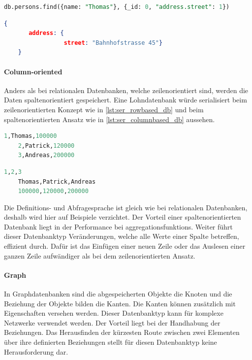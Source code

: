 \begin{lstlisting}[language=SQL, caption=Abfrage in MongoDB, label=lst:select_mongodb]  
    db.persons.find({name: "Thomas"}, {_id: 0, "address.street": 1})
\end{lstlisting}

\begin{lstlisting}[language=JSON, caption=Resultat der Abfrage in MongoDB, label=lst:select_result_mongodb]  
    {
       address: {
                 street: "Bahnhofstrasse 45"}
    }
\end{lstlisting}

\paragraph{Column-oriented}
Anders als bei relationalen Datenbanken, welche zeilenorientiert sind, werden die Daten spaltenorientiert gespeichert. Eine Lohndatenbank würde serialisiert beim zeilenorientierten Konzept
wie in \autoref{lst:ser_rowbased_db} und beim spaltenorientierten Ansatz wie in \autoref{lst:ser_columnbased_db} aussehen.

\begin{lstlisting}[language=SQL, caption=Serialisierung zeilenorientierte Datenbank, label=lst:ser_rowbased_db]  
    1,Thomas,100000
    2,Patrick,120000
    3,Andreas,200000
\end{lstlisting}

\begin{lstlisting}[language=SQL, caption=Serialisierung spaltenorientierte Datenbank, label=lst:ser_columnbased_db]  
    1,2,3
    Thomas,Patrick,Andreas
    100000,120000,200000
\end{lstlisting}

Die Definitions- und Abfragesprache ist gleich wie bei relationalen Datenbanken, deshalb wird hier auf Beispiele verzichtet. Der Vorteil 
einer spaltenorientierten Datenbank liegt in der Performance bei \glspl{aggregationsfunktion}. Weiter führt dieser Datenbanktyp Veränderungen, 
welche alle Werte einer Spalte betreffen, effizient durch. Dafür ist das Einfügen einer neuen Zeile oder das Auslesen einer ganzen Zeile aufwändiger als bei dem zeilenorientierten Ansatz.

\paragraph{Graph}
In Graphdatenbanken sind die abgespeicherten Objekte die Knoten und die Beziehung der Objekte bilden die Kanten. Die Kanten können zusätzlich mit Eigenschaften versehen werden. Dieser 
Datenbanktyp kann für komplexe Netzwerke verwendet werden. Der Vorteil liegt bei der Handhabung der Beziehungen. Das Herausfinden der kürzesten Route zwischen zwei Elementen über 
ihre definierten Beziehungen stellt für diesen Datenbanktyp keine Herausforderung dar.

